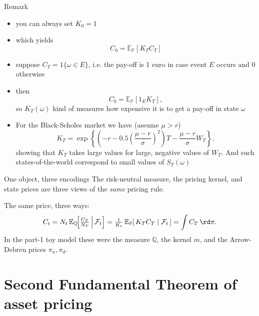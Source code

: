 \documentclass[pdf, handout]{beamer}
\begin{document}
\begin{frame}{Remark}
\begin{itemize}
\item you can always set $K_0=1$
\item which yields
\[
C_0 = \mathbb{E}_{\mathbb{P}}[ K_T C_T]
\]
\item
suppose $C_T = 1\{ \omega \in E\}$, i.e.
the pay-off is 1 euro in case event $E$ occurs
and 0 otherwise
\item
then
\[
C_0 = \mathbb{E}_{\mathbb{P}}[ 1_E K_T],
\]
so $K_T(\omega)$ kind of measures how
expensive it is to get a pay-off in state $\omega$
\item For the Black-Scholes market we have (assume
$\mu>r$)
\[
K_T=\exp\left\{
\left(-r-0.5\left(\frac{\mu-r}{\sigma}\right)^2 \right)T -\frac{\mu-r}{\sigma} W_T
\right\},
\]
showing that $K_T$ takes large values for large, negative values of $W_T$. And such states-of-the-world
correspond to small values of $S_T(\omega)$
\end{itemize}
\end{frame}

\begin{frame}{One object, three encodings}
The risk-neutral measure, the pricing kernel, and state prices are three views of the \emph{same} pricing rule.
\begin{center}
\end{center}
The same price, three ways:
\[ C_t = N_t\,\mathbb{E}_{\mathbb{Q}}\!\Big[\tfrac{C_T}{N_T}\,\Big|\,\mathcal{F}_t\Big]
= \tfrac{1}{K_t}\,\mathbb{E}_{\mathbb{P}}[\,K_T C_T\mid\mathcal{F}_t\,]
= \int C_T\,\rd\pi . \]
In the part-1 toy model these were the measure $\mathbb{Q}$, the kernel $m$, and the Arrow-Debreu prices $\pi_u,\pi_d$.
\end{frame}

\section{Second Fundamental Theorem of
asset pricing}
\end{document}
